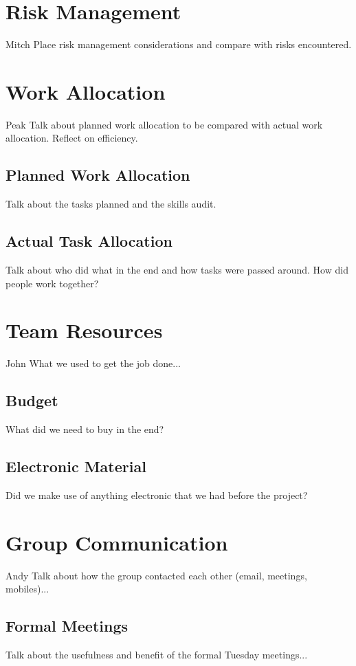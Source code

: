 \documentclass[oneside]{ecsgdp}         %
\begin{document}
\section{Risk Management}
Mitch
Place risk management considerations and compare with risks encountered.

\section{Work Allocation}
Peak
Talk about planned work allocation to be compared with actual work allocation. Reflect on efficiency.

\subsection{Planned Work Allocation}
Talk about the tasks planned and the skills audit.

\subsection{Actual Task Allocation}
Talk about who did what in the end and how tasks were passed around. How did people work together?

\section{Team Resources}
John
What we used to get the job done...

\subsection{Budget}
What did we need to buy in the end?

\subsection{Electronic Material}
Did we make use of anything electronic that we had before the project?

\section{Group Communication}
Andy
Talk about how the group contacted each other (email, meetings, mobiles)...

\subsection{Formal Meetings}
Talk about the usefulness and benefit of the formal Tuesday meetings...
\end{document}
